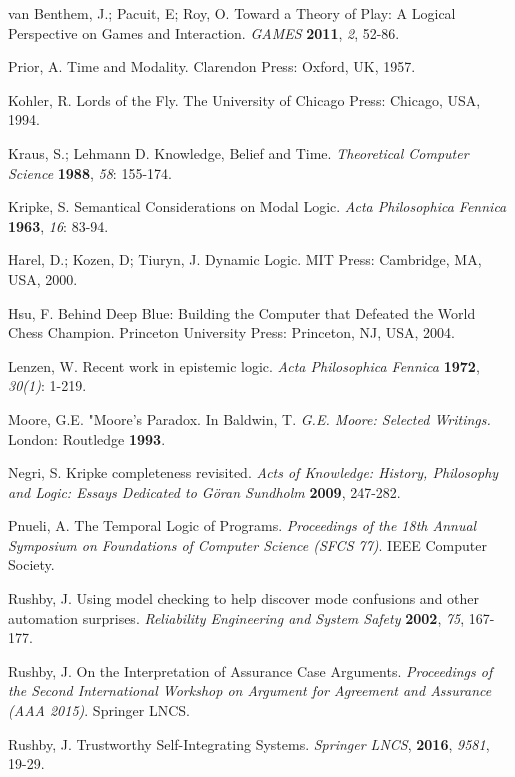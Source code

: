 \begin{thebibliography}{9}
	 	
	 	van Benthem, J.; Pacuit, E; Roy, O. Toward a Theory of Play: A Logical Perspective on Games and Interaction. {\em GAMES} {\bf 2011}, {\em 2}, 52-86.
	 	
	 	Prior, A. Time and Modality. Clarendon Press: Oxford, UK, 1957.
	 	
	 	Kohler, R. Lords of the Fly. The University of Chicago Press: Chicago, USA, 1994.
	 	
	 	Kraus, S.; Lehmann D. Knowledge, Belief and Time. {\em Theoretical Computer Science} {\bf 1988}, {\em 58}: 155-174.
	 	
	 	Kripke, S. Semantical Considerations on Modal Logic. {\em Acta Philosophica Fennica} {\bf 1963}, {\em 16}: 83-94.
	 	
	 	Harel, D.; Kozen, D; Tiuryn, J. Dynamic Logic. MIT Press: Cambridge, MA, USA, 2000.
	 	
	 	Hsu, F. Behind Deep Blue: Building the Computer that Defeated the World Chess Champion. Princeton University Press: Princeton, NJ, USA, 2004.
	 	
	 	Lenzen, W. Recent work in epistemic logic. {\em Acta Philosophica Fennica} {\bf 1972}, {\em 30(1)}: 1-219.
	 	
	 	Moore, G.E. "Moore's Paradox. In Baldwin, T. {\em G.E. Moore: Selected Writings.} London: Routledge {\bf 1993}.
	 	
	 	Negri, S. Kripke completeness revisited. {\em Acts of Knowledge: History, Philosophy and Logic: Essays Dedicated to G{\"o}ran Sundholm} {\bf 2009}, 247-282.
	 	
	 	Pnueli, A.  The Temporal Logic of Programs. {\em Proceedings of the 18th Annual Symposium on Foundations of Computer Science (SFCS 77)}. IEEE Computer Society.
	 	
	 	Rushby, J. Using model checking to help discover mode confusions and other automation surprises. {\em Reliability Engineering and System Safety} {\bf 2002}, {\em 75}, 167-177.
	 	
	 	Rushby, J. On the Interpretation of Assurance Case Arguments. {\em Proceedings of the Second International Workshop on Argument for Agreement and Assurance (AAA 2015)}. Springer LNCS.
	 	
	 	Rushby, J. Trustworthy Self-Integrating Systems. {\em Springer LNCS}, {\bf 2016}, {\em 9581}, 19-29.
	 	

\end{thebibliography}
